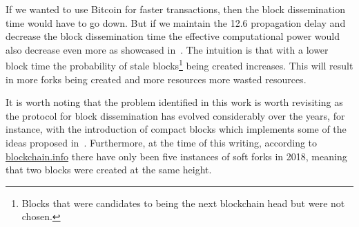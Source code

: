 If we wanted to use Bitcoin for faster transactions, then the block dissemination time would have to go down. But if we maintain the 12.6 propagation delay and decrease the block dissemination time the effective computational power would also decrease even more as showcased in~\cite{ethereumblog}. The intuition is that with a lower block time the probability of stale blocks\footnote{Blocks that were candidates to being the next blockchain head but were not chosen.} being created increases. This will result in more forks being created and more resources more wasted resources.


It is worth noting that the problem identified in this work is worth revisiting as the protocol for block dissemination has evolved considerably over the years, for instance, with the introduction of compact blocks which implements some of the ideas proposed in~\cite{decker2013information}. Furthermore, at the time of this writing, according to \url{blockchain.info} there have only been five instances of soft forks in 2018, meaning that two blocks were created at the same height.



